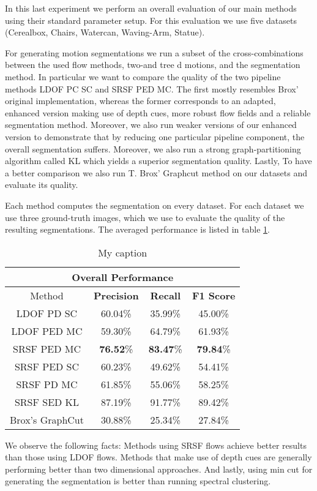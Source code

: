 In this last experiment we perform an overall evaluation of our main methods using their standard parameter setup. For this evaluation we use five datasets (Cerealbox, Chairs, Watercan, Waving-Arm, Statue). 

For generating motion segmentations we run a subset of the cross-combinations between the used flow methods, two-and tree d motions, and the segmentation method. In particular we want to compare the quality of the two pipeline methods LDOF PC SC and SRSF PED MC. The first mostly resembles Brox' original implementation, whereas the former corresponds to an adapted, enhanced version making use of depth cues, more robust flow fields and a reliable segmentation method. Moreover, we also run weaker versions of our enhanced version to demonstrate that by reducing one particular pipeline component, the overall segmentation suffers. Moreover, we also run a strong graph-partitioning algorithm called KL which yields a superior segmentation quality. Lastly, To have a better comparison we also run T. Brox' Graphcut method on our datasets and evaluate its quality.

Each method computes the segmentation on every dataset. For each dataset we use three ground-truth images, which we use to evaluate the quality of the resulting segmentations. The averaged performance is listed in table \ref{tab:overall_performance}.

\begin{table}[H]
\centering
\begin{tabular}{|c|c|c|c|}
\hline
\multicolumn{4}{|c|}{Overall Performance}                        \\ \hline
Method & \textbf{Precision} & \textbf{Recall} & \textbf{F1 Score} \\ \hline
LDOF PD SC & 60.04\%   & 35.99\%     & 45.00\%  \\ \hline
LDOF PED MC & 59.30\%   & 64.79\%     & 61.93\%  \\ \hline
SRSF PED MC & \textbf{76.52}\%   & \textbf{83.47}\%     & \textbf{79.84}\%  \\ \hline
SRSF PED SC & 60.23\%   & 49.62\%     & 54.41\%  \\ \hline 
SRSF PD MC & 61.85\%   & 55.06\%     & 58.25\%  \\ \hline
SRSF SED KL & 87.19\%   & 91.77\%     & 89.42\%  \\ \hline
Brox's GraphCut & 30.88\%   & 25.34\%     & 27.84\%  \\ \hline                   
\end{tabular}
\caption[Overall Performance]{My caption}
\label{tab:overall_performance}
\end{table}
We observe the following facts: Methods using SRSF flows achieve better results than those using LDOF flows. Methods that make use of depth cues are generally performing better than two dimensional approaches. And lastly, using min cut for generating the segmentation is better than running spectral clustering.

